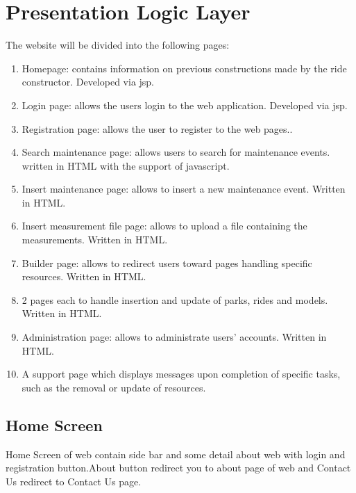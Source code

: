 \section{Presentation Logic Layer}
\graphicspath{ {./HW_1/images/} }

The website will be divided into the following pages:
\begin{enumerate}
    \item Homepage: contains information on previous constructions made by the ride constructor. Developed via
jsp.
    \item Login page: allows the users login to the web application. Developed via jsp.
    \item Registration page: allows the user to register to the web pages..
    \item Search maintenance page: allows users to search for maintenance events. written in HTML with the
support of javascript.
    \item Insert maintenance page: allows to insert a new maintenance event. Written in HTML.
    \item Insert measurement file page: allows to upload a file containing the measurements. Written in HTML.
    \item Builder page: allows to redirect users toward pages handling specific resources. Written in HTML.
    \item 2 pages each to handle insertion and update of parks, rides and models. Written in HTML.
    \item Administration page: allows to administrate users’ accounts. Written in HTML.
    \item A support page which displays messages upon completion of specific tasks, such as the removal or update
of resources.
\end{enumerate}

\subsection{Home Screen}
\caption{Home Screen of web contain side bar and some detail about web with login and registration button.About button redirect you to about page of web and Contact Us redirect to Contact Us page.}
\\

